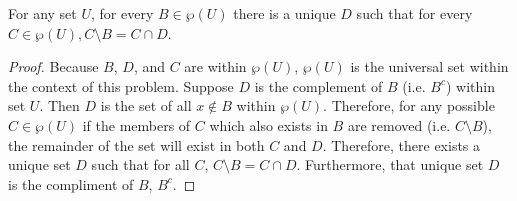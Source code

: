 
\begin{theorem}
  For any set $U$, for every $B\in \wp(U)$ there is a unique $D$ such that for
  every $C \in \wp(U), C \setminus B = C \cap D$.
\end{theorem}

\begin{proof}
  Because $B$, $D$, and $C$ are within $\wp(U)$, $\wp(U)$ is the universal set
  within the context of this problem. Suppose $D$ is the complement of $B$
  (i.e. $B^c$) within set $U$. Then $D$ is the set of all $x \notin B$ within
  $\wp(U)$. Therefore, for any possible $C \in \wp(U)$ if the members of $C$
  which also exists in $B$ are removed (i.e. $C \setminus B$), the remainder
  of the set will exist in both $C$ and $D$. Therefore, there exists a unique
  set $D$ such that for all $C$, $C \setminus B = C \cap D$. Furthermore, that
  unique set $D$ is the compliment of $B$, $B^c$.
\end{proof}
